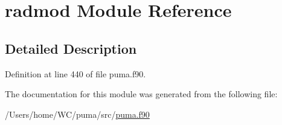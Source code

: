 \hypertarget{classradmod}{
\section{radmod \-Module \-Reference}
\label{classradmod}
}


\subsection{\-Detailed \-Description}


\-Definition at line 440 of file puma.\-f90.



\-The documentation for this module was generated from the following file\-:\begin{DoxyCompactItemize}
\item 
/\-Users/home/\-W\-C/puma/src/\hyperlink{puma_8f90}{puma.\-f90}\end{DoxyCompactItemize}
